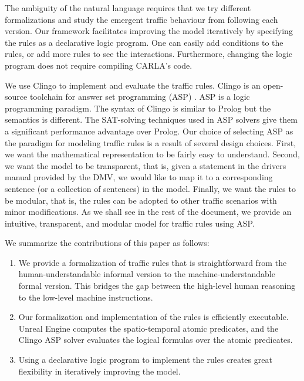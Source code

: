 The ambiguity of the natural language requires that we try different formalizations and study the emergent traffic behaviour from following each version. 
Our framework facilitates improving the model iteratively by specifying the rules as a declarative logic program.
One can easily add conditions to the rules, or add more rules to see the interactions.
Furthermore, changing the logic program does not require compiling CARLA's code.

We use Clingo to implement and evaluate the traffic rules. Clingo is an open-source toolchain for answer set programming (ASP) \cite{Gebser.2011}.
ASP is a logic programming paradigm.
The syntax of Clingo is similar to Prolog but the semantics is different.
The SAT-solving techniques used in ASP solvers give them a significant performance advantage over Prolog.
Our choice of selecting ASP as the paradigm for modeling traffic rules is a result of several design choices. 
First, we want the mathematical representation to be fairly easy to understand.
Second, we want the model to be transparent, that is, given a statement in the drivers manual provided by the DMV, we would like to map it to a corresponding sentence (or a collection of sentences) in the model.
Finally, we want the rules to be modular, that is, the rules can be adopted to other traffic scenarios with minor modifications. As we shall see in the rest of the document, we provide an intuitive, transparent, and modular model for traffic rules using ASP.

We summarize the contributions of this paper as follows:
\begin{enumerate}
    \item
    We provide a formalization of traffic rules that is straightforward
    from the human-understandable informal version to the machine-understandable formal version.
    This bridges the gap between the high-level human reasoning to the low-level machine instructions.
    \item
    Our formalization and implementation of the rules is efficiently executable.
    Unreal Engine computes the spatio-temporal atomic predicates,
    and the Clingo ASP solver evaluates the logical formulas over the atomic predicates.
    \item
    Using a declarative logic program to implement the rules creates great flexibility
    in iteratively improving the model.
\end{enumerate}
